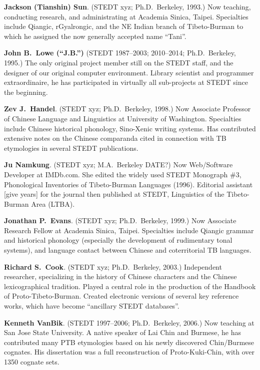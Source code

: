 \textbf{Jackson (Tianshin) Sun}. (STEDT xyz; Ph.D.\ Berkeley, 1993.) Now teaching, conducting research, and administrating at Academia Sinica, Taipei. Specialties include Qiangic, rGyalrongic, and the NE Indian branch of Tibeto-Burman to which he assigned the now generally accepted name “Tani”.

\textbf{John B.\ Lowe (“J.B.”)} (STEDT 1987–2003; 2010–2014; Ph.D.\ Berkeley, 1995.) The only original project member still on the STEDT staff, and the designer of our original computer environment. Library scientist and programmer extraordinaire, he has participated in virtually all sub-projects at STEDT since the beginning.

\textbf{Zev J.\ Handel}. (STEDT xyz; Ph.D.\ Berkeley, 1998.) Now Associate Professor of Chinese Language and Linguistics at University of Washington. Specialties include Chinese historical phonology, Sino-Xenic writing systems. Has contributed extensive notes on the Chinese comparanda cited in connection with TB etymologies in several STEDT publications.

\textbf{Ju Namkung}. (STEDT xyz; M.A.\ Berkeley DATE?) Now Web/Software Developer at IMDb.com. She edited the widely used STEDT Monograph \#3, Phonological Inventories of Tibeto-Burman Languages (1996). Editorial assistant [give years] for the journal then published at STEDT, Linguistics of the Tibeto-Burman Area (LTBA).

\textbf{Jonathan P.\ Evans}. (STEDT xyz; Ph.D.\ Berkeley, 1999.) Now Associate Research Fellow at Academia Sinica, Taipei. Specialties include Qiangic grammar and historical phonology (especially the development of rudimentary tonal systems), and language contact between Chinese and coterritorial TB languages.

\textbf{Richard S.\ Cook}. (STEDT xyz; Ph.D.\ Berkeley, 2003.) Independent researcher, specializing in the history of Chinese characters and the Chinese lexicographical tradition. Played a central role in the production of the Handbook of Proto-Tibeto-Burman. Created electronic versions of several key reference works, which have become “ancillary STEDT databases”.

\textbf{Kenneth VanBik}. (STEDT 1997–2006; Ph.D.\ Berkeley, 2006.) Now teaching at San Jose State University. A native speaker of Lai Chin and Burmese, he has contributed many PTB etymologies based on his newly discovered Chin/Burmese cognates. His dissertation was a full reconstruction of Proto-Kuki-Chin, with over 1350 cognate sets.

